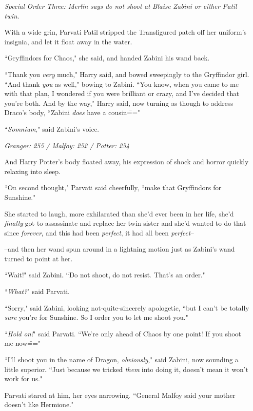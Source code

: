\emph{Special Order Three: Merlin says do not shoot at Blaise Zabini or either Patil twin.}

With a wide grin, Parvati Patil stripped the Transfigured patch off her uniform's insignia, and let it float away in the water.

``Gryffindors for Chaos," she said, and handed Zabini his wand back.

``Thank you \emph{very} much," Harry said, and bowed sweepingly to the Gryffindor girl. ``And thank \emph{you} as well," bowing to Zabini. ``You know, when you came to me with that plan, I wondered if you were brilliant or crazy, and I've decided that you're both. And by the way," Harry said, now turning as though to address Draco's body, ``Zabini \emph{does} have a cousin\==="

``\emph{Somnium}," said Zabini's voice.

\later

\emph{Granger: 255 / Malfoy: 252 / Potter: 254}

And Harry Potter's body floated away, his expression of shock and horror quickly relaxing into sleep.

``On second thought," Parvati said cheerfully, ``make that Gryffindors for Sunshine."

She started to laugh, more exhilarated than she'd ever been in her life, she'd \emph{finally} got to assassinate and replace her twin sister and she'd wanted to do that since \emph{forever}, and this had been \emph{perfect}, it had all been \emph{perfect}\---

\---and then her wand spun around in a lightning motion just as Zabini's wand turned to point at her.

``Wait!" said Zabini. ``Do not shoot, do not resist. That's an order."

``\emph{What?}" said Parvati.

``Sorry," said Zabini, looking not-quite-sincerely apologetic, ``but I can't be totally \emph{sure} you're for Sunshine. So I order you to let me shoot you."

``\emph{Hold on!}" said Parvati. ``We're only ahead of Chaos by one point! If you shoot me now\==="

``I'll shoot you in the name of Dragon, \emph{obviously}," said Zabini, now sounding a little superior. ``Just because we tricked \emph{them} into doing it, doesn't mean it won't work for us."

Parvati stared at him, her eyes narrowing. ``General Malfoy said your mother doesn't like Hermione."

